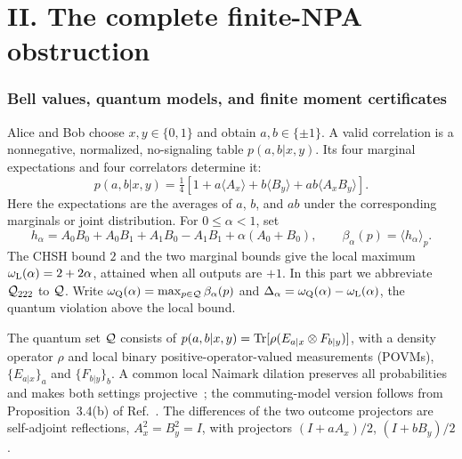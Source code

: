 \documentclass[11pt]{article}
\theoremstyle{remark}\newtheorem{remark}[theorem]{Remark}
\begin{document}
\clearpage
\part*{II. The complete finite-NPA obstruction}
\setcounter{section}{0}\setcounter{equation}{0}\setcounter{theorem}{0}
\renewcommand{\thesection}{S\arabic{section}}
\renewcommand{\thesubsection}{\thesection.\arabic{subsection}}
\renewcommand{\theequation}{S\arabic{equation}}
\renewcommand{\thetheorem}{S\arabic{theorem}}
\renewcommand{\theHequation}{S.\arabic{equation}}
\renewcommand{\theHsection}{S.\arabic{section}}
\section{Bell values, quantum models, and finite moment certificates}
\label{supp:sec:bell}\label{supp:sec:jordan}\label{supp:sec:npa}
Alice and Bob choose $x,y\in\{0,1\}$ and obtain $a,b\in\{\pm1\}$.
A valid correlation is a nonnegative, normalized, no-signaling table
$p(a,b|x,y)$. Its four marginal expectations and four correlators determine it:
\begin{equation}
p(a,b|x,y)=\tfrac14[1+a\langle A_x\rangle+b\langle B_y\rangle
+ab\langle A_xB_y\rangle].
\label{supp:eq:behavior-reconstruction}
\end{equation}
Here the expectations are the averages of $a$, $b$, and $ab$ under the
corresponding marginals or joint distribution. For $0\leq\alpha<1$, set
\begin{equation}
h_\alpha=A_0B_0+A_0B_1+A_1B_0-A_1B_1+\alpha(A_0+B_0),
\qquad \beta_\alpha(p)=\langle h_\alpha\rangle_p.
\label{supp:eq:bell-functional}
\end{equation}
The CHSH bound $2$ and the two marginal bounds give the local maximum
$\omega_{\rm L}(\alpha)=2+2\alpha$, attained when all outputs are $+1$.
In this part we abbreviate $\mathcal Q_{222}$ to $\mathcal Q$.
Write $\omega_{\rm Q}(\alpha)=\max_{p\in\mathcal Q}\beta_\alpha(p)$ and
$\Delta_\alpha=\omega_{\rm Q}(\alpha)-\omega_{\rm L}(\alpha)$,
the quantum violation above the local bound.

The quantum set $\mathcal Q$ consists of
$p(a,b|x,y)=\operatorname{Tr}[\rho(E_{a|x}\otimes F_{b|y})]$, with a density operator
$\rho$ and local binary positive-operator-valued measurements (POVMs),
$\{E_{a|x}\}_a$ and $\{F_{b|y}\}_b$. A common local Naimark dilation preserves
all probabilities and makes both settings projective~\cite{Naimark1940};
the commuting-model version follows from Proposition~3.4(b) of
Ref.~\cite{Fritz2012}. The differences of the two outcome projectors
are self-adjoint reflections,
$A_x^2=B_y^2=I$, with projectors $(I+aA_x)/2$, $(I+bB_y)/2$.
\end{document}

